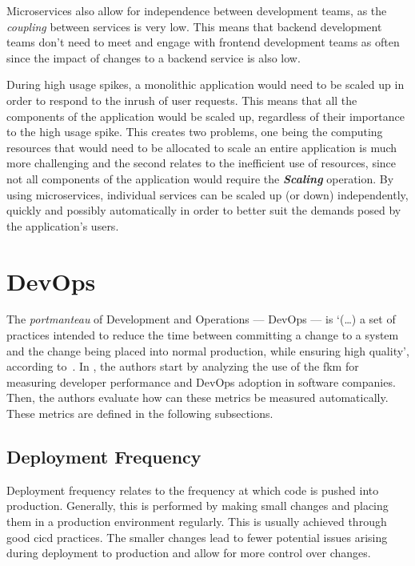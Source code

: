 Microservices also allow for independence between development teams, as the \textit{coupling} between services is very low. This means that backend development teams don't need to meet and engage with frontend development teams as often since the impact of changes to a backend service is also low.

During high usage spikes, a monolithic application would need to be scaled up in order to respond to the inrush of user requests. This means that all the components of the application would be scaled up, regardless of their importance to the high usage spike. This creates two problems, one being the computing resources that would need to be allocated to scale an entire application is much more challenging and the second relates to the inefficient use of resources, since not all components of the application would require the \textbf{\textit{Scaling}} operation. By using microservices, individual services can be scaled up (or down) independently, quickly and possibly automatically in order to better suit the demands posed by the application's users.


\section{DevOps}\label{state-of-the-art:s:devops}

The \textit{portmanteau} of Development and Operations --- DevOps --- is `(\ldots) a set of practices intended to reduce the time between committing a change to a system and the change being placed into normal production, while ensuring high quality', according to~\Parencite{bass_weber_zhu_2015}. 
In \parencite{sallin_kropp_anslow_quilty_meier_2021}, the authors start by analyzing the use of the \gls{fkm} \parencite{48455} for measuring developer performance and DevOps adoption in software companies. Then, the authors evaluate how can these metrics be measured automatically. These metrics are defined in the following subsections.

\subsection{Deployment Frequency}\label{state-of-the-art:ss:deployment-frequency}

Deployment frequency relates to the frequency at which code is pushed into production. Generally, this is performed by making small changes and placing them in a production environment regularly. This is usually achieved through good \gls{cicd} practices. The smaller changes lead to fewer potential issues arising during deployment to production and allow for more control over changes.

